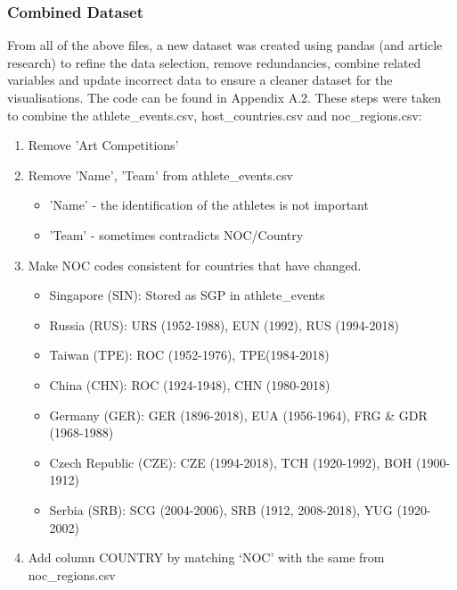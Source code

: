 \documentclass[a4 paper, 12pt]{article}
\begin{document}
    \subsubsection{Combined Dataset}
    From all of the above files, a new dataset was created using pandas (and article research) to refine the data selection, remove redundancies, combine related variables and update incorrect data to ensure a cleaner dataset for the visualisations. The code can be found in Appendix A.2. These steps were taken to combine the athlete\_events.csv, host\_countries.csv and noc\_regions.csv:
        \begin{enumerate}
            \item Remove 'Art Competitions' 
            \item Remove 'Name', 'Team' from athlete\_events.csv
                \begin{itemize}
                    \item 'Name' - the identification of the athletes is not important
                    \item 'Team' - sometimes contradicts NOC/Country
                \end{itemize}            
            \item Make NOC codes consistent for countries that have changed.            
               \begin{itemize}
                    \item Singapore (SIN): Stored as SGP in athlete\_events
                    \item Russia (RUS): URS (1952-1988), EUN (1992), RUS (1994-2018)
                    \item Taiwan (TPE): ROC (1952-1976), TPE(1984-2018)
                    \item China (CHN): ROC (1924-1948), CHN (1980-2018)
                    \item Germany (GER): GER (1896-2018), EUA (1956-1964), FRG \& GDR (1968-1988)
                    \item Czech Republic (CZE): CZE (1994-2018), TCH (1920-1992), BOH (1900-1912)
                    \item Serbia (SRB): SCG (2004-2006), SRB (1912, 2008-2018), YUG (1920-2002)
                \end{itemize}            
            \item Add column COUNTRY by matching ‘NOC’ with the same from noc\_regions.csv

\end{enumerate}
\end{document}
